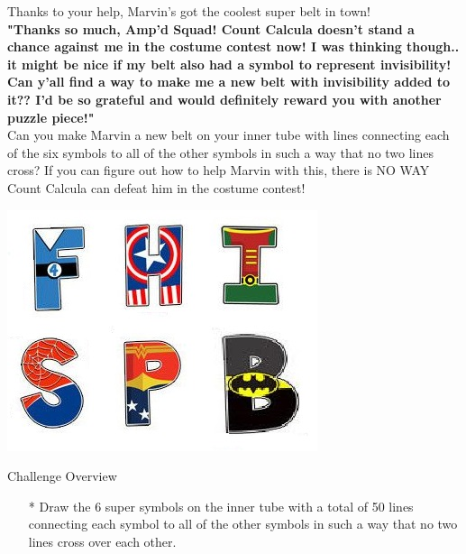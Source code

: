 


Thanks to your help, Marvin's got the coolest super belt in town!\\

\textbf{"Thanks so much, Amp'd Squad! Count Calcula doesn't stand a chance against me in the costume contest now! I was thinking though.. it might be nice if my belt also had a symbol to represent invisibility! Can y'all find a way to make me a new belt with invisibility added to it?? I'd be so grateful and would definitely reward you with another puzzle piece!"}\\

Can you make Marvin a new belt on your inner tube with lines connecting each of the six symbols to all of the other symbols in such a way that no two lines cross? If you can figure out how to help Marvin with this, there is NO WAY Count Calcula can defeat him in the costume contest!


    \includegraphics{assets/kat/alpha2}


Challenge Overview
\begin{itemize}
\item[*] Draw the 6 super symbols on the inner tube with a total of 50 lines connecting each symbol to all of the other symbols in such a way that no two lines cross over each other.
\end{itemize}
